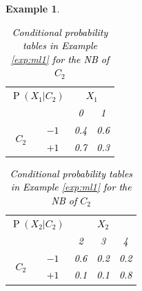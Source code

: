 \documentclass[11pt,a4paper, twoside]{book}
\newtheorem{example}{Example}[chapter]
\newcommand{\Pp}{\operatorname{P}}
\begin{document}
\begin{example}
\begin{table}
 \caption{Conditional probability tables in Example \ref{exp:ml1} for the NB of $C_2$}
\label{tab:condprob2}
\centering
\begin{subtable}{0.4\textwidth}
\textcolor{black}{
\begin{tabular}{cccc}
\toprule
\multicolumn{2}{c}{$\Pp(X_1|C_2)$}  &  \multicolumn{2}{c}{$X_1$}\\
&  &  0    &   1 \\
\cmidrule{3-4}
\multirow{2}{0.5cm}{$C_2$} 
 & $-1$ & 0.4 & 0.6 \\
 & $+1$ & 0.7 & 0.3 \\
 \bottomrule
\end{tabular}}
\end{subtable}
\begin{subtable}{0.4\textwidth}
\textcolor{black}{\begin{tabular}{ccccc}
\toprule
\multicolumn{2}{c}{$\Pp(X_2|C_2)$}  &  \multicolumn{3}{c}{$X_2$}\\
&  &  2    &   3  & 4 \\
\cmidrule{3-5}
\multirow{2}{0.5cm}{$C_2$} 
 & $-1$ & 0.6 & 0.2 & 0.2 \\
 & $+1$ & 0.1 & 0.1 & 0.8 \\
 \bottomrule
\end{tabular}}
\end{subtable}



\end{table}
\end{example}
\end{document}
